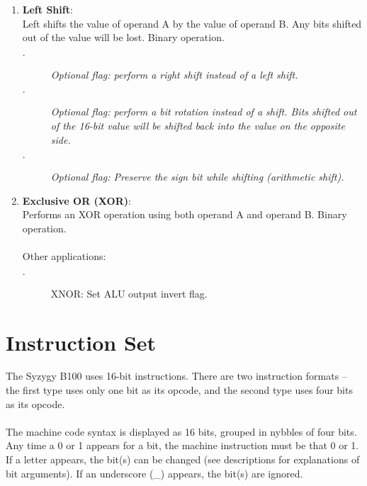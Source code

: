 \documentclass{article}
\begin{document}
\begin{enumerate}
				\item \textbf{Left Shift}: \\
				Left shifts the value of operand A by the value of operand B. Any bits shifted out of the value will be lost. Binary operation.
				
				\begin{description}
					\item[$\cdot$] \textit{Optional flag: perform a right shift instead of a left shift.}
					\item[$\cdot$] \textit{Optional flag: perform a bit rotation instead of a shift. Bits shifted out of the 16-bit value will be shifted back into the value on the opposite side.}
					\item[$\cdot$] \textit{Optional flag: Preserve the sign bit while shifting (arithmetic shift).}
				\end{description}
				
				\item \textbf{Exclusive OR (XOR)}: \\
				Performs an XOR operation using both operand A and operand B. Binary operation.\\
				\\
				Other applications:
				\begin{description}
					\item[$\cdot$] XNOR: Set ALU output invert flag.
				\end{description}
				
				
			\end{enumerate}
		
		\section{Instruction Set}
		
			The Syzygy B100 uses 16-bit instructions. There are two instruction formats -- the first type uses only one bit as its opcode, and the second type uses four bits as its opcode.\\
			\\
			The machine code syntax is displayed as 16 bits, grouped in nybbles of four bits. Any time a 0 or 1 appears for a bit, the machine instruction must be that 0 or 1. If a letter appears, the bit(s) can be changed (see descriptions for explanations of bit arguments). If an underscore (\_) appears, the bit(s) are ignored.
			
\end{document}
